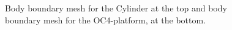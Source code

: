 \documentclass[12pt,a4paper,titlepage]{article}
\begin{document}
\begin{figure}[ht]
\centering
{}
\caption{Body boundary mesh for the Cylinder at the top and body boundary mesh for the OC4-platform, at the bottom.}\label{fig:meshesCylinderOC4}
\end{figure}
\end{document}
